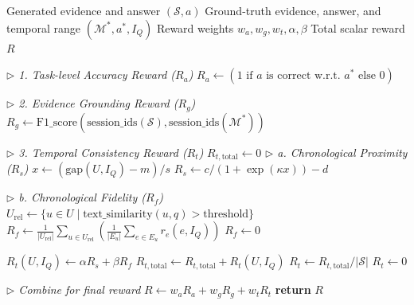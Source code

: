 \documentclass{article} %
\begin{document}
\begin{algorithm}[t!]
\caption{Multi-Level Reward Calculation}
\label{alg:reward_calc}
\begin{algorithmic}[1]
\Require
\Statex Generated evidence and answer $(\mathcal{S}, a)$
\Statex Ground-truth evidence, answer, and temporal range $(\mathcal{M}^*, a^*, I_Q)$
\Statex Reward weights $w_a, w_g, w_t, \alpha, \beta$
\Ensure
\Statex Total scalar reward $R$

    \Statex \textit{\quad $\rhd$ 1. Task-level Accuracy Reward ($R_a$)}
    \State $R_a \leftarrow (1 \text{ if } a \text{ is correct w.r.t. } a^* \text{ else } 0)$
    
    \Statex \textit{\quad $\rhd$ 2. Evidence Grounding Reward ($R_g$)}
    \State $R_g \leftarrow \text{F1\_score}(\text{session\_ids}(\mathcal{S}), \text{session\_ids}(\mathcal{M}^*))$
    
    \Statex \textit{\quad $\rhd$ 3. Temporal Consistency Reward ($R_t$)}
    \State $R_{t, \text{total}} \leftarrow 0$
            \Statex \textit{\qquad $\rhd$ a. Chronological Proximity ($R_s$)}
            \State $x \leftarrow (\mathrm{gap}(U, I_Q) - m) / s$
            \State $R_s \leftarrow c / (1 + \exp(\kappa x)) - d$
            
            \Statex \textit{\qquad $\rhd$ b. Chronological Fidelity ($R_f$)}
            \State $U_{\text{rel}} \leftarrow \{ u \in U \mid \text{text\_similarity}(u, q) > \text{threshold} \}$
                \State $R_f \leftarrow \frac{1}{|U_{\text{rel}}|} \sum_{u \in U_{\text{rel}}} \left( \frac{1}{|E_u|} \sum_{e \in E_u} r_e(e, I_Q) \right)$
            \Else
                \State $R_f \leftarrow 0$
            \EndIf
            
            \State $R_t(U, I_Q) \leftarrow \alpha R_s + \beta R_f$
            \State $R_{t, \text{total}} \leftarrow R_{t, \text{total}} + R_t(U, I_Q)$
        \EndFor
        \State $R_t \leftarrow R_{t, \text{total}} / |\mathcal{S}|$ 
    \Else
        \State $R_t \leftarrow 0$
    \EndIf

    \Statex \textit{\quad $\rhd$ Combine for final reward}
    \State $R \leftarrow w_a R_a + w_g R_g + w_t R_t$
    \State \textbf{return} $R$
\EndFunction
\end{algorithmic}
\end{algorithm}
\end{document}
